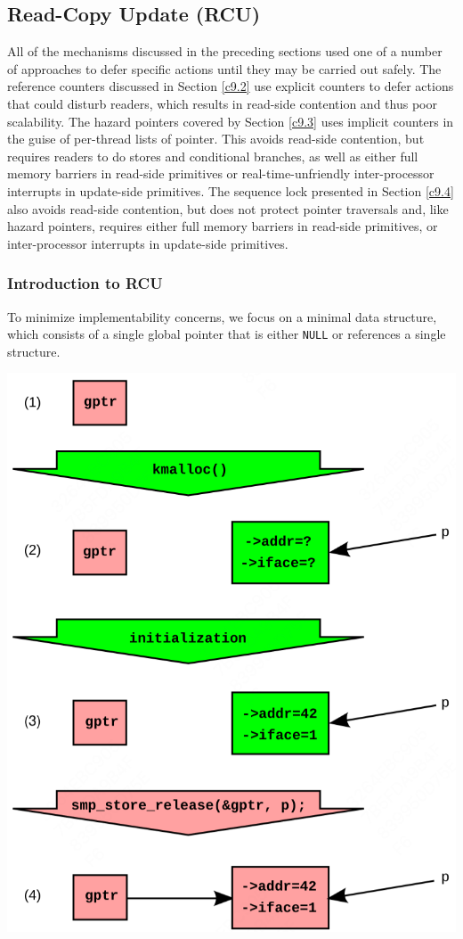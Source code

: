 \documentclass[11pt]{article}
\begin{document}
\subsection{Read-Copy Update (RCU)}
\label{sec:org6b5648c}
\label{c9.5}
All of the mechanisms discussed in the preceding sections used one of a number of approaches to defer
specific actions until they may be carried out safely. The reference counters discussed in Section \ref{c9.2}
use explicit counters to defer actions that could disturb readers, which results in read-side
contention and thus poor scalability. The hazard pointers covered by Section \ref{c9.3} uses implicit
counters in the guise of per-thread lists of pointer. This avoids read-side contention, but requires
readers to do stores and conditional branches, as well as either full memory barriers in read-side
primitives or real-time-unfriendly inter-processor interrupts in update-side primitives. The sequence
lock presented in Section \ref{c9.4} also avoids read-side contention, but does not protect pointer
traversals and, like hazard pointers, requires either full memory barriers in read-side primitives, or
inter-processor interrupts in update-side primitives.
\subsubsection{Introduction to RCU}
\label{sec:org5f4a78d}
To minimize implementability concerns, we focus on a minimal data structure, which consists of a
single global pointer that is either \texttt{NULL} or references a single structure.
\begin{center}
\includegraphics[width=.8\textwidth]{../images/perfbook/6.png}
\end{center}
\end{document}
